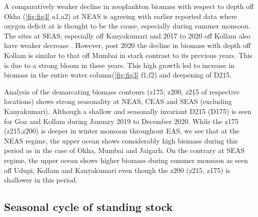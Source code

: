 \documentclass{article}
\begin{document}
	A comparatively weaker decline in zooplankton biomass with respect to depth off Okha (\cref{fig:fig3} a1,a2) at NEAS is agreeing with earlier reported data \cite{madhupratap2001mesozooplankton,smith2005mesozooplankton,wishner1998mesozooplankton} where oxygen deficit at is thought to be the cause, especially during summer monsoon. The sites at SEAS, especially off Kanyakumari and 2017 to 2020 off Kollam also have weaker decrease \citep{madhupratap2001mesozooplankton, aparna2022seasonal}. However, post 2020 the decline in biomass with depth off Kollam is similar to that off Mumbai in stark contrast to its previous years. This is due to a strong bloom in these years. This high growth led to increase in biomass in the entire water column(\cref{fig:fig3} f1,f2) and deepening of D215. 

	Analysis of the demarcating biomass contours (z175, z200, z215 of respective locations) shows strong seasonality at NEAS, CEAS and SEAS (excluding Kanyakumari). Although a shallow and seasonally invariant D215 (D175) is seen for Goa and Kollam  during January 2019 to December 2020. While the z175 (z215,z200) is deeper in winter monsoon throughout EAS, we see that at the NEAS regime, the upper ocean shows considerably high biomass during this period as in the case of Okha, Mumbai and Jaigarh. On the contrary at SEAS regime, the upper ocean shows higher biomass during summer monsoon as seen off Udupi, Kollam and Kanyakumari even though the z200 (z215, z175) is shallower in this period. 
	
	\subsection{Seasonal cycle of standing stock}
	\label{sec:seasonalcyclezss}


	\newpage	 

	\newpage
	
	
	
\linespread{1.5}	
{\footnotesize 	 %
}	
\newpage
{} 
\end{document}
